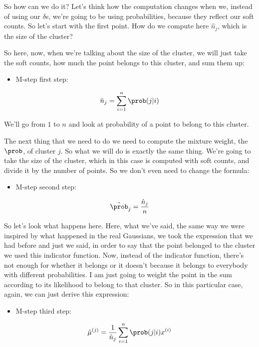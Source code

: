 \documentclass[a4paper, 12pt]{article}
\begin{document}
So how can we do it? Let's think how the computation changes when we, instead of
using our \(\delta\)s, we're going to be using probabilities, because they
reflect our soft counts. So let's start with the first point. How do we compute
here \(\hat{n}_j\), which is the size of the cluster?

So here, now, when we're talking about the size of the cluster, we will just
take the soft counts, how much the point belongs to this cluster, and sum them
up:

\begin{itemize}
\item M-step first step:
\end{itemize}
\begin{equation}
\label{eq:org1e17bff}
\hat{n}_j = \sum_{i=1}^{n} \prob(j|i)
\end{equation}

We'll go from \(1\) to \(n\) and look at probability of a point to belong to
this cluster.

The next thing that we need to do we need to compute the mixture weight, the
\(\prob\), of cluster \(j\). So what we will do is exactly the same thing. We're
going to take the size of the cluster, which in this case is computed with soft
counts, and divide it by the number of points. So we don't even need to change
the formula:

\begin{itemize}
\item M-step second step:
\end{itemize}
\begin{equation}
\label{eq:org5df7d25}
\hat{\prob}_j = \frac{\hat{n}_j}{n}
\end{equation}

So let's look what happens here. Here, what we've said, the same way we were
inspired by what happened in the real Gaussians, we took the expression that we
had before and just we said, in order to say that the point belonged to the
cluster we used this indicator function. Now, instead of the indicator function,
there's not enough for whether it belongs or it doesn't because it belongs to
everybody with different probabilities. I am just going to weight the point in
the sum according to its likelihood to belong to that cluster. So in this
particular case, again, we can just derive this expression:

\begin{itemize}
\item M-step third step:
\end{itemize}
\begin{equation}
\label{eq:org837258c}
\hat{\mu}^{(j)} = \frac{1}{\hat{n}_j} \sum_{i=1}^{n} \prob(j|i) x^{(i)}
\end{equation}
\end{document}

